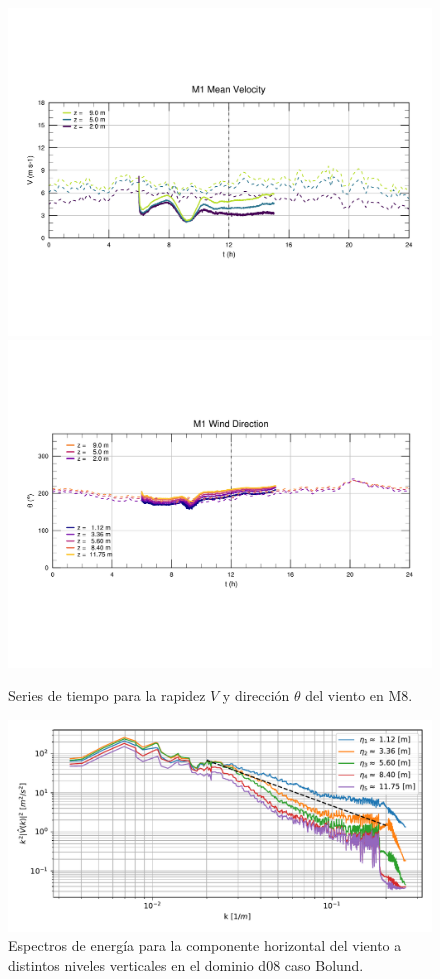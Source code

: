 \begin{figure}[H]
	\centering
	\includegraphics[width=0.87\linewidth,page=8,trim={9mm 57mm 10mm 60mm},clip]{Imagenes/06/bol/ts_interpol_compare.pdf}\\%
	\includegraphics[width=0.87\linewidth,page=8,trim={12mm 52mm 10mm 60mm},clip]{Imagenes/06/bol/ts_interpol_compare_o.pdf}%
	\vspace{-2mm}\caption{Series de tiempo para la rapidez $V$ y dirección $\theta$ del viento en M8.}
	\label{fig:06_bol_ts_m8}
\end{figure}

\begin{figure}[H]
	\centering
	\includegraphics[width=1.0\linewidth,page=1,trim={3mm 5mm 3mm 3mm},clip]{Imagenes/06/bol/spectra}%
	\caption{Espectros de energía para la componente horizontal del viento a distintos niveles verticales en el dominio d08 caso Bolund.}
	\label{fig:06_bol_spectrum}
\end{figure}

